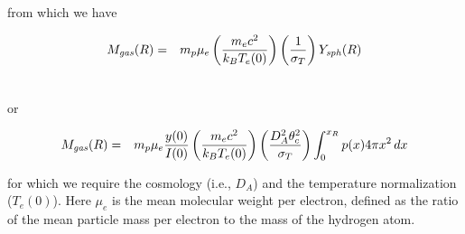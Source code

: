 from which we have

\begin{eqnarray}
M_{\it gas}(R) &=& m_p\mu_e \left({{m_e c^2}\over{k_B T_e(0)}}\right)\left({{1}\over{\sigma_T}}\right)Y_{\it sph}(R)\\\nonumber
\end{eqnarray}

or

\begin{eqnarray}
M_{\it gas}(R) &=& m_p\mu_e {{y(0)}\over{I(0)}}\left({{m_e c^2}\over{k_B T_e(0)}}\right)\left({{D^2_A\theta^2_c}\over{\sigma_T}}\right)\int^{x_R}_{0}{p(x)4\pi x^2\,dx}
\label{eq:mgas}
\end{eqnarray}

for which we require the cosmology (i.e., $D_A$) and the temperature normalization ($T_e(0)$).  Here $\mu_e$ is the mean molecular weight per electron, defined as the ratio of the mean particle mass per electron to the mass of the hydrogen atom.

